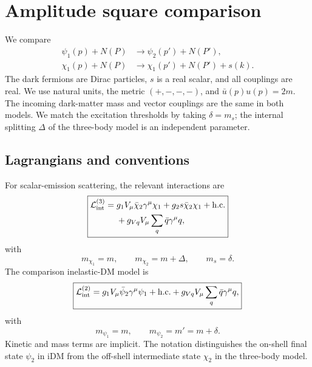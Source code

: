 \documentclass[prd,showpacs,preprintnumbers,amsmath,amssymb,twocolumn,
superscriptaddress,notitlepage]{revtex4-2}
\newcommand{\hcc}{\mathrm{h.c.}}
\begin{document}
{}


\clearpage

\onecolumngrid

\section{Amplitude square comparison}


We compare
\begin{align}
\psi_1(p)+N(P)&\longrightarrow\psi_2(p')+N(P'),\\
\chi_1(p)+N(P)&\longrightarrow\chi_1(p')+N(P')+s(k).
\end{align}
The dark fermions are Dirac particles, $s$ is a real scalar, and all
couplings are real. We use natural units, the metric $(+,-,-,-)$,
and $\bar u(p)u(p)=2m$. The incoming dark-matter mass and vector
couplings are the same in both models. We match the excitation
thresholds by taking $\delta=m_s$; the internal splitting $\Delta$
of the three-body model is an independent parameter.

\subsection{Lagrangians and conventions}

For scalar-emission scattering, the relevant interactions are
\begin{equation}
\boxed{\begin{aligned}
\mathcal{L}^{(3)}_{\rm int}
={}&g_1V_\mu\bar\chi_2\gamma^\mu\chi_1
+g_2s\bar\chi_2\chi_1+\hcc\\
&+g_{Vq}V_\mu\sum_q\bar q\gamma^\mu q ,
\end{aligned}}
\label{eq:lag-three}
\end{equation}
with
\begin{equation}
m_{\chi_1}=m,\qquad m_{\chi_2}=m+\Delta,\qquad m_s=\delta.
\end{equation}
The comparison inelastic-DM model is
\begin{equation}
\boxed{
\mathcal{L}^{(2)}_{\rm int}
=g_1V_\mu\bar\psi_2\gamma^\mu\psi_1+\hcc
+g_{Vq}V_\mu\sum_q\bar q\gamma^\mu q ,
}
\label{eq:lag-two}
\end{equation}
with
\begin{equation}
m_{\psi_1}=m,\qquad m_{\psi_2}=m'=m+\delta.
\end{equation}
Kinetic and mass terms are implicit.
The notation distinguishes the on-shell final state $\psi_2$ in iDM
from the off-shell intermediate state $\chi_2$ in the three-body model.
\end{document}

